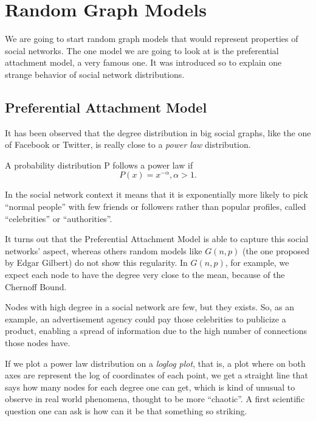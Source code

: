 \chapter{Random Graph Models}

We are going to start random graph models that would represent properties of social networks. The one model we are going to look at is the preferential attachment model, a very famous one. It was introduced so to explain one strange behavior of
social network distributions.

\section{Preferential Attachment Model}

It has been observed that the degree distribution in big social graphs, like the one of Facebook or Twitter, is really close to a \emph{power law} distribution.

\begin{defn}
	A probability distribution P follows a power law if
	\begin{equation}
		P(x) = x^{-\alpha}, \alpha > 1.
	\end{equation}
\end{defn}

In the social network context it means that it is exponentially more likely to pick ``normal people'' with few friends or followers rather than popular profiles, called ``celebrities'' or ``authorities''.

It turns out that the Preferential Attachment Model is able to capture this social networks' aspect, whereas others random models like $G(n,p)$ (the one proposed by Edgar Gilbert) do not show this regularity. In $G(n,p)$, for example, we expect each node to have the degree very close to the mean, because of the Chernoff Bound.

Nodes with high degree in a social network are few, but they exists. So, as an example, an advertisement agency could pay those celebrities to publicize a product, enabling a spread of information due to the high number of connections those nodes have.

If we plot a power law distribution on a \emph{loglog plot}, that is, a plot where on both axes are represent the log of coordinates of each point, we get a straight line that says how many nodes for each degree one can get, which is kind of unusual to observe in real world phenomena, thought to be more ``chaotic''. A first scientific question one can ask is how can it be that something so striking.

